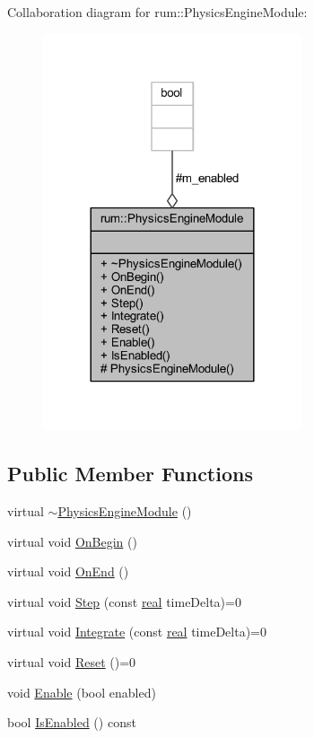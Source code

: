Collaboration diagram for rum\+:\+:Physics\+Engine\+Module\+:\nopagebreak
\begin{figure}[H]
\begin{center}
\leavevmode
\includegraphics[width=216pt]{classrum_1_1_physics_engine_module__coll__graph}
\end{center}
\end{figure}
\subsection*{Public Member Functions}
\begin{DoxyCompactItemize}
\item 
virtual \hyperlink{classrum_1_1_physics_engine_module_a5ca9d6dd8dc60cec6c562f5aa80ecf64}{$\sim$\+Physics\+Engine\+Module} ()
\item 
virtual void \hyperlink{classrum_1_1_physics_engine_module_a6d599ea88574a867e22b569b8e83f5c2}{On\+Begin} ()
\item 
virtual void \hyperlink{classrum_1_1_physics_engine_module_a82e0d611a6a42f118d8ae92ff3ee91a0}{On\+End} ()
\item 
virtual void \hyperlink{classrum_1_1_physics_engine_module_a0c8bfcf27aee16f05ef9a83948f330ac}{Step} (const \hyperlink{namespacerum_a7e8cca23573d5eaead0f138cbaa4862c}{real} time\+Delta)=0
\item 
virtual void \hyperlink{classrum_1_1_physics_engine_module_a8635a9194b86cf3c70723ebb4e8c967c}{Integrate} (const \hyperlink{namespacerum_a7e8cca23573d5eaead0f138cbaa4862c}{real} time\+Delta)=0
\item 
virtual void \hyperlink{classrum_1_1_physics_engine_module_a1ee77a3a48ced8291a86506e6904ca9e}{Reset} ()=0
\item 
void \hyperlink{classrum_1_1_physics_engine_module_a5570ab64f9ff8e6449cbdbc32c9c36c9}{Enable} (bool enabled)
\item 
bool \hyperlink{classrum_1_1_physics_engine_module_ae87521693e0b32f7ed741eb73b4db806}{Is\+Enabled} () const
\end{DoxyCompactItemize}
